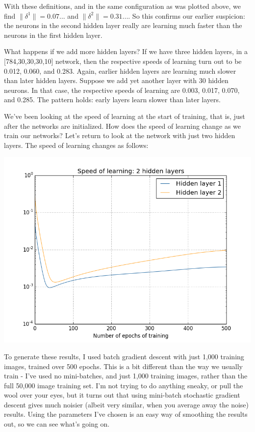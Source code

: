 \documentclass[a4paper,twoside,10pt]{book}
\begin{document}
With these definitions, and in the same configuration as was plotted above, we find $\|\delta^1\| = 0.07...$ and $\|\delta^2\|=0.31...$. So this confirms our earlier suspicion: the neurons in the second hidden layer really are learning much faster than the neurons in the first hidden layer.

What happens if we add more hidden layers? If we have three hidden layers, in a [784,30,30,30,10] network, then the respective speeds of learning turn out to be 0.012, 0.060, and 0.283. Again, earlier hidden layers are learning much slower than later hidden layers. Suppose we add yet another layer with 30 hidden neurons. In that case, the respective speeds of learning are 0.003, 0.017, 0.070, and 0.285. The pattern holds: early layers learn slower than later layers.

We've been looking at the speed of learning at the start of training, that is, just after the networks are initialized. How does the speed of learning change as we train our networks? Let's return to look at the network with just two hidden layers. The speed of learning changes as follows:
\begin{center}
	\includegraphics[width=0.7\linewidth]{figures/ch5/training_speed_2_layers}
\end{center}
To generate these results, I used batch gradient descent with just 1,000 training images, trained over 500 epochs. This is a bit different than the way we usually train - I've used no mini-batches, and just 1,000 training images, rather than the full 50,000 image training set. I'm not trying to do anything sneaky, or pull the wool over your eyes, but it turns out that using mini-batch stochastic gradient descent gives much noisier (albeit very similar, when you average away the noise) results. Using the parameters I've chosen is an easy way of smoothing the results out, so we can see what's going on.
\end{document}

